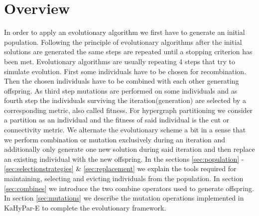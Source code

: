 \documentclass[a4paper,12pt,titlepage, BCOR7mm,headsepline]{scrbook}
\numberwithin{equation}{section}
\begin{document}
\section{Overview}
In order to apply an evolutionary algorithm we first have to generate an initial population. 
Following the principle of evolutionary algorithms after the initial solutions are generated  the same steps are repeated until a stopping criterion has been met.
Evolutionary algorithms are usually repeating 4 steps that try to simulate evolution. First some individuals have to be chosen for recombination. Then the chosen individuals have to be combined with each other generating offspring. As third step mutations are performed on some individuals and as fourth step the individuals surviving the iteration(generation) are selected by a corresponding metric, also called fitness. For hypergraph partitioning we consider a partition as an individual and the fitness of said individual is the cut or connectivity metric. We alternate the evolutionary scheme a bit in a sense that we perform combination or mutation exclusively during an iteration and additionally only generate one new solution during said iteration and then replace an existing individual with the new offspring. 
In the sections \ref{sec:population} - \ref{sec:selectionstrategies} \& \ref{sec:replacement} we explain the tools required for maintaining, selecting and evicting individuals from the population. In section \ref{sec:combines} we introduce the two combine operators used to generate offspring. In section \ref{sec:mutations} we describe the mutation operations implemented in KaHyPar-E to complete the evolutionary framework.
\end{document}
